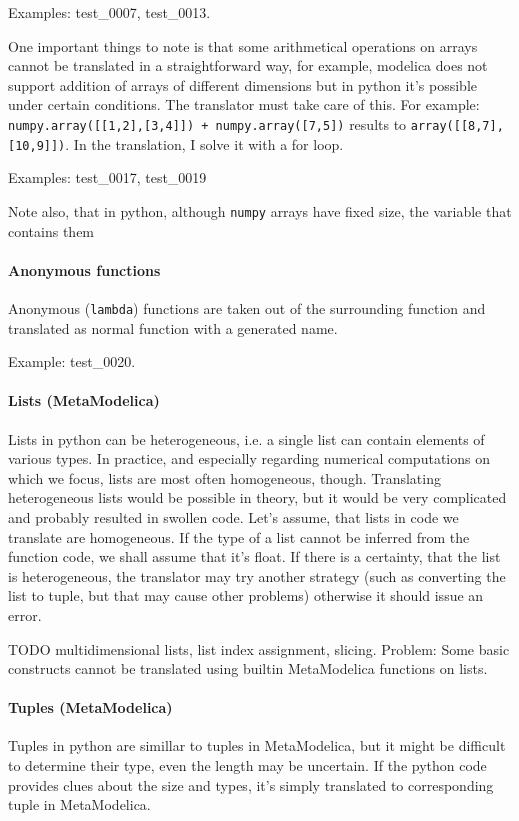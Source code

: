 \documentclass[a4paper,10pt]{article}
\begin{document}
Examples: test\_0007, test\_0013.

One important things to note is that some arithmetical operations on arrays cannot be translated in a straightforward 
way, for example, modelica does not support addition of arrays of different dimensions but in python it's possible
under certain conditions. The translator must take care of this. For example: {\tt numpy.array([[1,2],[3,4]]) + numpy.array([7,5])}
results to {\tt array([[8,7],[10,9]])}. In the translation, I solve it with a for loop. 

Examples: test\_0017, test\_0019

Note also, that in python, although {\tt numpy} arrays have fixed size, the variable that contains them 

\paragraph{Anonymous functions}
Anonymous ({\tt lambda}) functions are taken out of the surrounding function and translated as normal function with a generated name.

Example: test\_0020.

\paragraph{Lists (MetaModelica)} Lists in python can be heterogeneous, i.e. a single list can contain elements of various types.
In practice, and especially regarding numerical computations on which we focus, lists are most often homogeneous, though.
Translating heterogeneous lists would be possible in theory, but it would be very complicated and probably resulted in
swollen code. Let's assume, that lists in code we translate are homogeneous. If the type of a list cannot be inferred from
the function code, we shall assume that it's float. If there is a certainty, that the list is heterogeneous, the translator
may try another strategy (such as converting the list to tuple, but that may cause other problems) otherwise it should
issue an error.


TODO multidimensional lists, list index assignment, slicing. Problem: Some basic constructs cannot be translated using builtin MetaModelica
functions on lists.

\paragraph{Tuples (MetaModelica)} 
Tuples in python are simillar to tuples in MetaModelica, but it might be difficult to determine their type, even the length may
be uncertain. If the python code provides clues about the size and types, it's simply translated to corresponding tuple in MetaModelica.
\end{document}
